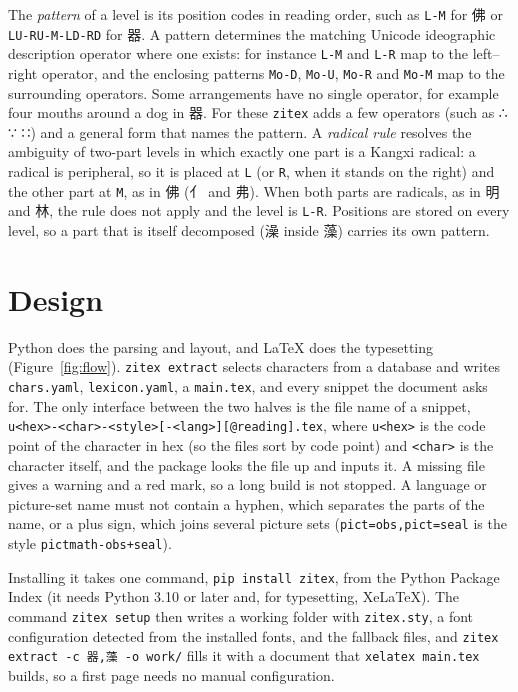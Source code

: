 \documentclass[11pt]{article}
\begin{document}
The \emph{pattern} of a level is its position codes in reading order, such as \texttt{L-M} for 佛 or
\texttt{LU-RU-M-LD-RD} for 器. A pattern determines the matching Unicode ideographic description operator where one exists:
for instance \texttt{L-M} and \texttt{L-R} map to the left--right operator, and the enclosing patterns \texttt{Mo-D},
\texttt{Mo-U}, \texttt{Mo-R} and \texttt{Mo-M} map to the surrounding operators. Some arrangements have no single operator,
for example four mouths around a dog in 器. For these \texttt{zitex} adds a few operators (such as ∴ ∵ ∷) and a general form
that names the pattern. A \emph{radical rule} resolves the ambiguity of two-part levels in which exactly one part is a Kangxi radical: a radical is peripheral, so it
is placed at \texttt{L} (or \texttt{R}, when it stands on the right) and the other part at \texttt{M}, as in 佛 (亻 and 弗). When both parts are radicals,
as in 明 and 林, the rule does not apply and the level is \texttt{L-R}. Positions are stored on every level, so a
part that is itself decomposed (澡 inside 藻) carries its own pattern.

\section{Design}\label{sec:design}
Python does the parsing and layout, and \LaTeX{} does the typesetting (Figure~\ref{fig:flow}). \texttt{zitex extract} selects characters
from a database and writes \texttt{chars.yaml}, \texttt{lexicon.yaml}, a \texttt{main.tex}, and every snippet the document asks for.
The only interface between the two halves is the file name of a snippet,
\texttt{u<hex>-<char>-<style>[-<lang>][@reading].tex}, where \texttt{u<hex>} is the code point of the character in hex (so the files sort by code point) and \texttt{<char>} is the character itself, and the package looks the file up and inputs it. A missing file gives a warning
and a red mark, so a long build is not stopped. A language or picture-set name must not contain a hyphen, which separates the parts of the name, or a plus sign, which joins several picture sets (\texttt{pict=obs,pict=seal} is the style \texttt{pictmath-obs+seal}).

Installing it takes one command, \texttt{pip install zitex}, from the Python Package Index (it needs Python 3.10 or later and, for typesetting, XeLaTeX). The command
\texttt{zitex setup} then writes a working folder with \texttt{zitex.sty}, a font configuration detected from the installed fonts, and the fallback files, and
\texttt{zitex extract -c 器,藻 -o work/} fills it with a document that \texttt{xelatex main.tex} builds, so a first page needs no manual configuration.
\end{document}
